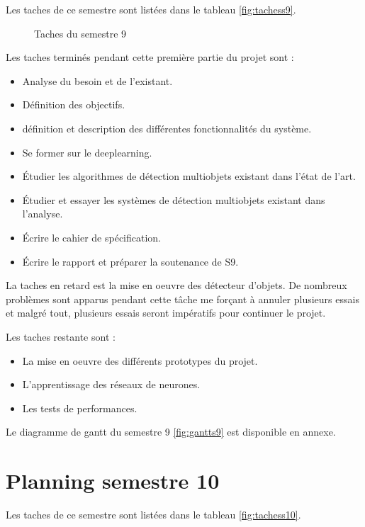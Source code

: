 \documentclass[debug,nodate,hideweeklyreports]{polytech/polytech}
\begin{document}
Les taches de ce semestre sont listées dans le tableau \autoref{fig:tachess9}.

\begin{figure}
  \caption{Taches du semestre 9}
  \label{fig:tachess9}
\end{figure}

Les taches terminés pendant cette première partie du projet sont :

\begin{itemize}
\item Analyse du besoin et de l'existant.
\item Définition des objectifs.
\item définition et description des différentes fonctionnalités du système.
\item Se former sur le \gls{deeplearning}.
\item Étudier les algorithmes de détection multiobjets existant dans l'état de l'art.
\item Étudier et essayer les systèmes de détection multiobjets existant dans l'analyse.
\item Écrire le cahier de spécification.
\item Écrire le rapport et préparer la soutenance de S9.
\end{itemize}

La taches en retard est la mise en oeuvre des détecteur d'objets. De nombreux problèmes sont apparus pendant cette tâche me forçant à annuler plusieurs essais et malgré tout, plusieurs essais seront impératifs pour continuer le projet.

Les taches restante sont :
\begin{itemize}
\item La mise en oeuvre des différents prototypes du projet.
\item L'apprentissage des réseaux de neurones.
\item Les tests de performances.
\end{itemize}

Le diagramme de gantt du semestre 9 \autoref{fig:gantts9} est disponible en annexe.

\section{Planning semestre 10}

Les taches de ce semestre sont listées dans le tableau \autoref{fig:tachess10}.
\end{document}

